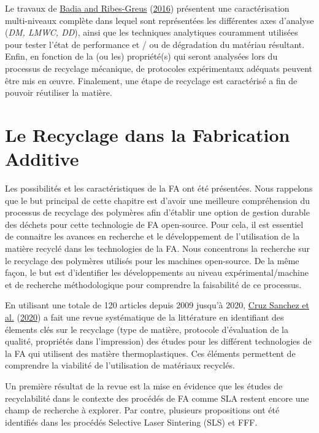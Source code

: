 \documentclass[
]{article}
\begin{document}
Le travaux de \protect\hyperlink{ref-Badia2016}{Badia and Ribes-Greus}
(\protect\hyperlink{ref-Badia2016}{2016}) présentent une caractérisation
multi-niveaux complète dans lequel sont représentées les différentes
axes d'analyse (\emph{DM, LMWC, DD}), ainsi que les techniques
analytiques couramment utilisées pour tester l'état de performance et /
ou de dégradation du matériau résultant. Enfin, en fonction de la (ou
les) propriété(s) qui seront analysées lors du processus de recyclage
mécanique, de protocoles expérimentaux adéquats peuvent être mis en
œuvre. Finalement, une étape de recyclage est caractérisé a fin de
pouvoir réutiliser la matière.

\hypertarget{le-recyclage-dans-la-fabrication-additive}{%
\section{Le Recyclage dans la Fabrication
Additive}\label{le-recyclage-dans-la-fabrication-additive}}

Les possibilités et les caractéristiques de la FA ont été présentées.
Nous rappelons que le but principal de cette chapitre est d'avoir une
meilleure compréhension du processus de recyclage des polymères afin
d'établir une option de gestion durable des déchets pour cette
technologie de FA open-source. Pour cela, il est essentiel de connaitre
les avances en recherche et le développement de l'utilisation de la
matière recyclé dans les technologies de la FA. Nous concentrons la
recherche sur le recyclage des polymères utilisés pour les machines
open-source. De la même façon, le but est d'identifier les
développements au niveau expérimental/machine et de recherche
méthodologique pour comprendre la faisabilité de ce processus.

En utilisant une totale de 120 articles depuis 2009 jusqu'à 2020,
\protect\hyperlink{ref-CruzSanchez2020}{Cruz Sanchez et al.}
(\protect\hyperlink{ref-CruzSanchez2020}{2020}) a fait une revue
systématique de la littérature en identifiant des élements clés sur le
recyclage (type de matière, protocole d'évaluation de la qualité,
propriétés dans l'impression) des études pour les différent technologies
de la FA qui utilisent des matière thermoplastiques. Ces éléments
permettent de comprendre la viabilité de l'utilisation de matériaux
recyclés.

Un première résultat de la revue est la mise en évidence que les études
de recyclabilité dans le contexte des procédés de FA comme SLA restent
encore une champ de recherche à explorer. Par contre, plusieurs
propositions ont été identifiés dans les procédés Selective Laser
Sintering (SLS) et FFF.
\end{document}
